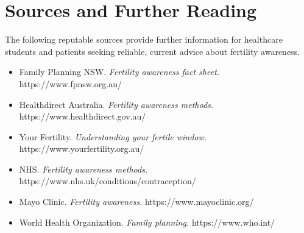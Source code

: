 \section*{Sources and Further Reading}
The following reputable sources provide further information for healthcare students and patients seeking reliable, current advice about fertility awareness.
\begin{itemize}
    \item Family Planning NSW. \textit{Fertility awareness fact sheet.} https://www.fpnsw.org.au/
    \item Healthdirect Australia. \textit{Fertility awareness methods.} https://www.healthdirect.gov.au/
    \item Your Fertility. \textit{Understanding your fertile window.} https://www.yourfertility.org.au/
    \item NHS. \textit{Fertility awareness methods.} https://www.nhs.uk/conditions/contraception/
    \item Mayo Clinic. \textit{Fertility awareness.} https://www.mayoclinic.org/
    \item World Health Organization. \textit{Family planning.} https://www.who.int/
\end{itemize}
